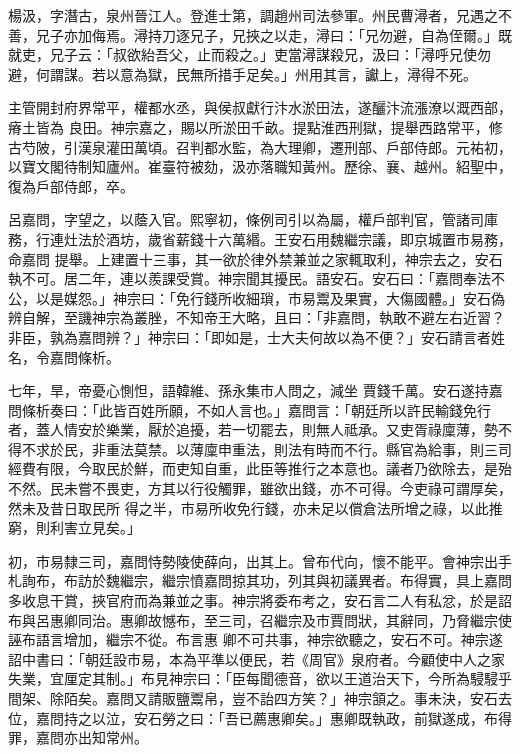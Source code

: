 \begin{pinyinscope}
 楊汲，字潛古，泉州晉江人。登進士第，調趙州司法參軍。州民曹潯者，兄遇之不善，兄子亦加侮焉。潯持刀逐兄子，兄挾之以走，潯曰：「兄勿避，自為侄爾。」既就吏，兄子云：「叔欲紿吾父，止而殺之。」吏當潯謀殺兄，汲曰：「潯呼兄使勿避，何謂謀。若以意為獄，民無所措手足矣。」州用其言，讞上，潯得不死。



 主管開封府界常平，權都水丞，與侯叔獻行汴水淤田法，遂釃汴流漲潦以溉西部，瘠土皆為
 良田。神宗嘉之，賜以所淤田千畝。提點淮西刑獄，提舉西路常平，修古芍陂，引漢泉灌田萬頃。召判都水監，為大理卿，遷刑部、戶部侍郎。元祐初，以寶文閣待制知廬州。崔臺符被劾，汲亦落職知黃州。歷徐、襄、越州。紹聖中，復為戶部侍郎，卒。



 呂嘉問，字望之，以蔭入官。熙寧初，條例司引以為屬，權戶部判官，管諸司庫務，行連灶法於酒坊，歲省薪錢十六萬緡。王安石用魏繼宗議，即京城置市易務，命嘉問
 提舉。上建置十三事，其一欲於律外禁兼並之家輒取利，神宗去之，安石執不可。居二年，連以羨課受賞。神宗聞其擾民。語安石。安石曰：「嘉問奉法不公，以是媒怨。」神宗曰：「免行錢所收細瑣，市易鬻及果實，大傷國體。」安石偽辨自解，至譏神宗為叢脞，不知帝王大略，且曰：「非嘉問，執敢不避左右近習？非臣，孰為嘉問辨？」神宗曰：「即如是，士大夫何故以為不便？」安石請言者姓名，令嘉問條析。



 七年，旱，帝憂心惻怛，語韓維、孫永集市人問之，減坐
 賈錢千萬。安石遂持嘉問條析奏曰：「此皆百姓所願，不如人言也。」嘉問言：「朝廷所以許民輸錢免行者，蓋人情安於樂業，厭於追擾，若一切罷去，則無人祗承。又吏胥祿廩薄，勢不得不求於民，非重法莫禁。以薄廩申重法，則法有時而不行。縣官為給事，則三司經費有限，今取民於鮮，而吏知自重，此臣等推行之本意也。議者乃欲除去，是殆不然。民未嘗不畏吏，方其以行役觸罪，雖欲出錢，亦不可得。今吏祿可謂厚矣，然未及昔日取民所
 得之半，市易所收免行錢，亦未足以償倉法所增之祿，以此推窮，則利害立見矣。」



 初，市易隸三司，嘉問恃勢陵使薛向，出其上。曾布代向，懷不能平。會神宗出手札詢布，布訪於魏繼宗，繼宗憤嘉問掠其功，列其與初議異者。布得實，具上嘉問多收息干賞，挾官府而為兼並之事。神宗將委布考之，安石言二人有私忿，於是詔布與呂惠卿同治。惠卿故憾布，至三司，召繼宗及市賈問狀，其辭同，乃脅繼宗使誣布語言增加，繼宗不從。布言惠
 卿不可共事，神宗欲聽之，安石不可。神宗遂詔中書曰：「朝廷設市易，本為平準以便民，若《周官》泉府者。今顧使中人之家失業，宜厘定其制。」布見神宗曰：「臣每聞德音，欲以王道治天下，今所為駸駸乎間架、除陌矣。嘉問又請販鹽鬻帛，豈不詒四方笑？」神宗頷之。事未決，安石去位，嘉問持之以泣，安石勞之曰：「吾已薦惠卿矣。」惠卿既執政，前獄遂成，布得罪，嘉問亦出知常州。




\end{pinyinscope}
